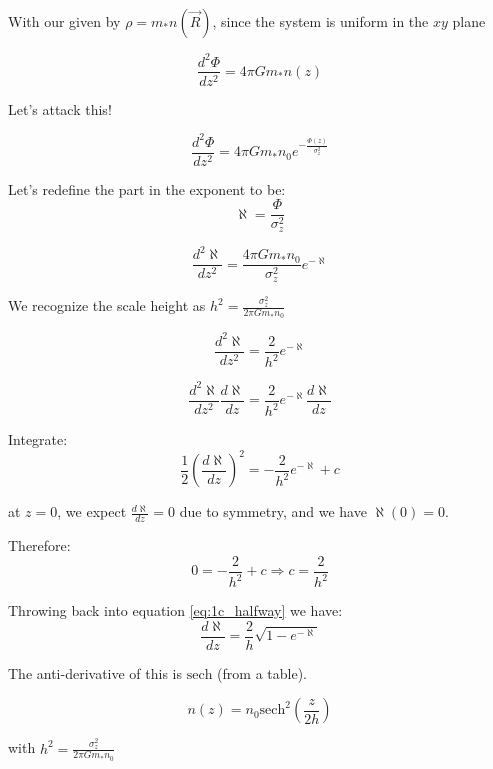 With our given by $\rho = m_* n(\vec{R})$, since the system is uniform in the $xy$ plane

\begin{equation}
    \frac{d^2\Phi}{dz^2} = 4\pi Gm_*n(z)
\end{equation}

Let's attack this!

\begin{equation}
    \frac{d^2\Phi}{dz^2} = 4\pi Gm_*n_0 e^{-\frac{\Phi(z)}{\sigma_z^2}}
\end{equation}

Let's redefine the part in the exponent to be:
\begin{equation}
    \aleph = \frac{\Phi}{\sigma_z^2}
\end{equation}

\begin{equation}
    \frac{d^2\aleph}{dz^2} = \frac{4\pi Gm_*n_0}{\sigma_z^2} e^{- \aleph}
\end{equation}

We recognize the scale height as $\boxed{h^2 = \frac{\sigma_z^2}{2\pi Gm_*n_0}}$

\begin{equation}
    \frac{d^2\aleph}{dz^2} = \frac{2}{h^2} e^{- \aleph}
\end{equation}

\begin{equation}
    \frac{d^2\aleph}{dz^2}\frac{d\aleph}{dz} = \frac{2}{h^2} e^{- \aleph}\frac{d\aleph}{dz}
\end{equation}

Integrate:
\begin{equation} \label{eq:1c_halfway}
    \frac{1}{2}(\frac{d\aleph}{dz})^2 = -\frac{2}{h^2} e^{- \aleph} +c
\end{equation}

at $z = 0$, we expect $\frac{d\aleph}{dz} = 0 $ due to symmetry, and we have $\aleph(0) = 0$.

Therefore:
\begin{equation}
   0 = -\frac{2}{h^2} +c \Rightarrow c =  \frac{2}{h^2}
\end{equation}

Throwing back into equation \ref{eq:1c_halfway} we have:
\begin{equation}
    \frac{d\aleph}{dz} = \frac{2}{h} \sqrt{1 - e^{-\aleph}}
\end{equation}

The anti-derivative of this is $\mathrm{sech}$ (from a table).

\begin{equation}
    \boxed{n(z) = n_0 \mathrm{sech}^2(\frac{z}{2h})}
\end{equation}

with $\boxed{h^2 = \frac{\sigma_z^2}{2\pi Gm_*n_0}}$







